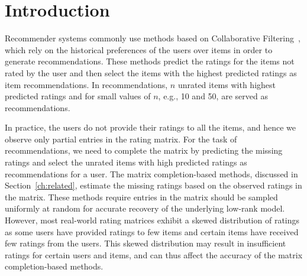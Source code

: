 \section{Introduction} \label{ch:matcomp:intro}


Recommender systems
commonly use methods based on Collaborative Filtering~\cite{SarwarKarypis01},
which rely on the
historical preferences of the users over items in order to generate
recommendations. 
These methods predict the ratings for the items not rated by
the user and then select the items with the highest predicted ratings as 
item recommendations.
In \TOPN recommendations, $n$ unrated items with highest predicted ratings and
for small values of $n$, e.g., 10 and 50, are
served as recommendations.

In practice, the users do not provide their ratings to all the items, and hence
we observe only partial entries in the rating matrix. For the task of
recommendations, we need to complete the matrix by predicting the missing
ratings and select the unrated items with high predicted ratings as
recommendations for a user.
The matrix completion-based methods, discussed in Section~\ref{ch:related}, estimate the missing ratings based on the observed ratings in the matrix. These methods require entries in the matrix should be sampled uniformly at random for accurate recovery of the underlying low-rank model.
However, most real-world rating matrices exhibit a skewed distribution of
ratings as some users have provided ratings to few items and certain items have
received few ratings from the users. This skewed distribution may result in
insufficient ratings for certain users and items, and can thus affect the
accuracy of the matrix completion-based methods.

\iffalse
However, most real-world rating matrices do not satisfy the requirement of the
uniform random sampling as some users have provided ratings to few items and
certain items have received few ratings from the users; thereby leading to a
skewed distribution of ratings in the user-item rating matrix.
However, most real-world rating matrices do not satisfy the requirement of the
uniform random sampling as some users have provided ratings to few items and
certain items have received few ratings from the users; thereby leading to a
non-uniform and sparse rating matrix.
The potential issues associated with the fact that the observed entries are not
randomly distributed, have recently been studied in the context of
not-missing-at-random~\cite{Steck2010MNAR,Steck2013EvalRec} approaches and various methods have been developed that
incorporate a missing data model~\cite{lim2015top,KimRecsys2014} to improve the quality of the recommendations.
\fi


